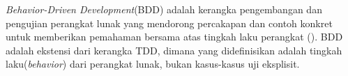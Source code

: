 \emph{Behavior-Driven Development}(BDD) adalah kerangka pengembangan dan pengujian perangkat lunak
yang mendorong percakapan dan contoh konkret untuk memberikan pemahaman bersama atas tingkah laku
perangkat (\cite{dan_bdd}). BDD adalah ekstensi dari kerangka TDD, dimana yang didefinisikan adalah
tingkah laku(\emph{behavior}) dari perangkat lunak, bukan kasus-kasus uji eksplisit.


